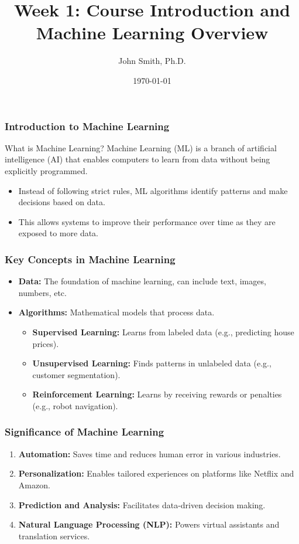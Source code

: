 \documentclass[aspectratio=169]{beamer}
\title[Machine Learning Overview]{Week 1: Course Introduction and Machine Learning Overview}
\author[J. Smith]{John Smith, Ph.D.}
\institute[University Name]{
  Department of Computer Science\\
  University Name\\
  \vspace{0.3cm}
  Email: email@university.edu\\
  Website: www.university.edu
}
\date{\today}
\begin{document}
\frame{\titlepage}

\begin{frame}[fragile]
    \titlepage
\end{frame}

\begin{frame}[fragile]
    \frametitle{Introduction to Machine Learning}
    \begin{block}{What is Machine Learning?}
        Machine Learning (ML) is a branch of artificial intelligence (AI) that enables computers to learn from data without being explicitly programmed.
        \begin{itemize}
            \item Instead of following strict rules, ML algorithms identify patterns and make decisions based on data.
            \item This allows systems to improve their performance over time as they are exposed to more data.
        \end{itemize}
    \end{block}
\end{frame}

\begin{frame}[fragile]
    \frametitle{Key Concepts in Machine Learning}
    \begin{itemize}
        \item \textbf{Data:} The foundation of machine learning, can include text, images, numbers, etc.
        \item \textbf{Algorithms:} Mathematical models that process data.
        \begin{itemize}
            \item \textbf{Supervised Learning:} Learns from labeled data (e.g., predicting house prices).
            \item \textbf{Unsupervised Learning:} Finds patterns in unlabeled data (e.g., customer segmentation).
            \item \textbf{Reinforcement Learning:} Learns by receiving rewards or penalties (e.g., robot navigation).
        \end{itemize}
    \end{itemize}
\end{frame}

\begin{frame}[fragile]
    \frametitle{Significance of Machine Learning}
    \begin{enumerate}
        \item \textbf{Automation:} Saves time and reduces human error in various industries.
        \item \textbf{Personalization:} Enables tailored experiences on platforms like Netflix and Amazon.
        \item \textbf{Prediction and Analysis:} Facilitates data-driven decision making.
        \item \textbf{Natural Language Processing (NLP):} Powers virtual assistants and translation services.
    \end{enumerate}
\end{frame}
\end{document}
